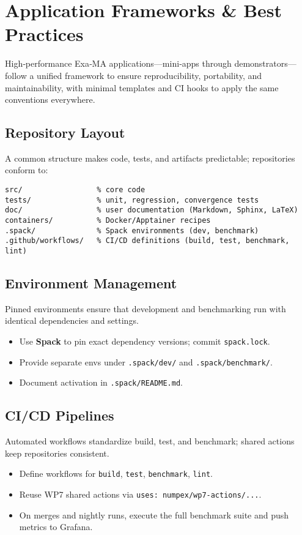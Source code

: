 
\section{Application Frameworks \& Best Practices}
\label{sec:apps-framework}

High‑performance Exa‑MA applications—mini‑apps through demonstrators—follow a unified framework to ensure reproducibility, portability, and maintainability, with minimal templates and CI hooks to apply the same conventions everywhere.

\subsection{Repository Layout}
A common structure makes code, tests, and artifacts predictable; repositories conform to:
\begin{verbatim}
src/                 % core code
tests/               % unit, regression, convergence tests
doc/                 % user documentation (Markdown, Sphinx, LaTeX)
containers/          % Docker/Apptainer recipes
.spack/              % Spack environments (dev, benchmark)
.github/workflows/   % CI/CD definitions (build, test, benchmark, lint)
\end{verbatim}

\subsection{Environment Management}
Pinned environments ensure that development and benchmarking run with identical dependencies and settings.
\begin{itemize}
  \item Use \textbf{Spack} to pin exact dependency versions; commit \texttt{spack.lock}.
  \item Provide separate envs under \texttt{.spack/dev/} and \texttt{.spack/benchmark/}.
  \item Document activation in \texttt{.spack/README.md}.
\end{itemize}

\subsection{CI/CD Pipelines}
Automated workflows standardize build, test, and benchmark; shared actions keep repositories consistent.
\begin{itemize}
  \item Define workflows for \texttt{build}, \texttt{test}, \texttt{benchmark}, \texttt{lint}.
  \item Reuse WP7 shared actions via \texttt{uses: numpex/wp7-actions/...}.
  \item On merges and nightly runs, execute the full benchmark suite and push metrics to Grafana.
\end{itemize}

